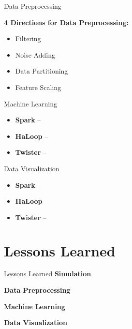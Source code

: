 \documentclass{beamer}
\begin{document}
\begin{frame}{Data Preprocessing}

\textbf{4 Directions for Data Preprocessing:}
\begin{itemize}
\item Filtering
\item Noise Adding
\item Data Partitioning
\item Feature Scaling
\end{itemize}

\end{frame}

\begin{frame}{Machine Learning}

\begin{itemize}
\item \textbf{Spark} -- 
\item \textbf{HaLoop} -- 
\item \textbf{Twister} -- 
\end{itemize}

\end{frame}

\begin{frame}{Data Visualization}

\begin{itemize}
\item \textbf{Spark} -- 
\item \textbf{HaLoop} -- 
\item \textbf{Twister} -- 
\end{itemize}

\end{frame}


\section{Lessons Learned}

\begin{frame}{Lessons Learned}
\textbf{Simulation}
\begin{itemize}

\end{itemize}

\textbf{Data Preprocessing}
\begin{itemize}

\end{itemize}

\textbf{Machine Learning}
\begin{itemize}

\end{itemize}

\textbf{Data Visualization}
\begin{itemize}

\end{itemize}

\end{frame}
\end{document}
